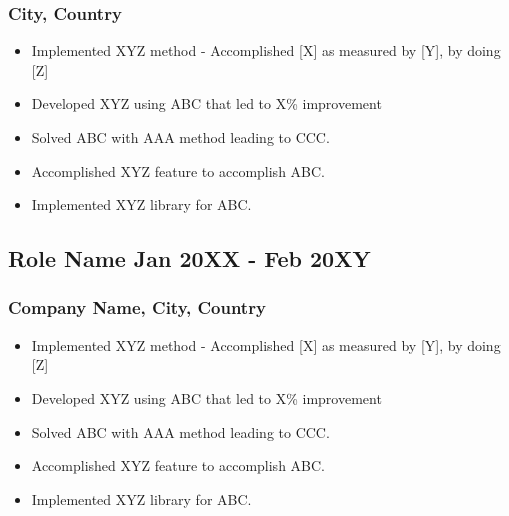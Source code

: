 \documentclass[11pt]{article}
\begin{document}
\subsubsection{City, Country}
\begin{itemize}
    \item[\textbullet] Implemented XYZ method - Accomplished [X] as measured by [Y], by doing [Z] 
    \item[\textbullet]  Developed XYZ using ABC that led to X\% improvement 
    \item[\textbullet] Solved ABC with AAA method leading to CCC.
    \item[\textbullet]  Accomplished XYZ feature to accomplish ABC.
    \item[\textbullet]  Implemented XYZ library for ABC.
\end{itemize}

\subsection{Role Name \hfill \normalfont Jan 20XX - Feb 20XY}
\subsubsection{Company Name, City, Country}
\begin{itemize}
    \item[\textbullet] Implemented XYZ method - Accomplished [X] as measured by [Y], by doing [Z] 
    \item[\textbullet]  Developed XYZ using ABC that led to X\% improvement 
    \item[\textbullet] Solved ABC with AAA method leading to CCC.
    \item[\textbullet]  Accomplished XYZ feature to accomplish ABC.
    \item[\textbullet]  Implemented XYZ library for ABC.
\end{itemize}
\end{document}
